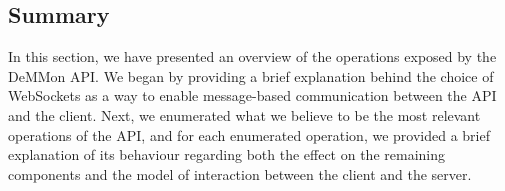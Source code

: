 \subsection{Summary}

In this section, we have presented an overview of the operations exposed by the DeMMon API. We began by providing a brief explanation behind the choice of WebSockets \cite{websocketsRFC} as a way to enable message-based communication between the API and the client. Next, we enumerated what we believe to be the most relevant operations of the API, and for each enumerated operation, we provided a brief explanation of its behaviour regarding both the effect on the remaining components and the model of interaction between the client and the server. 